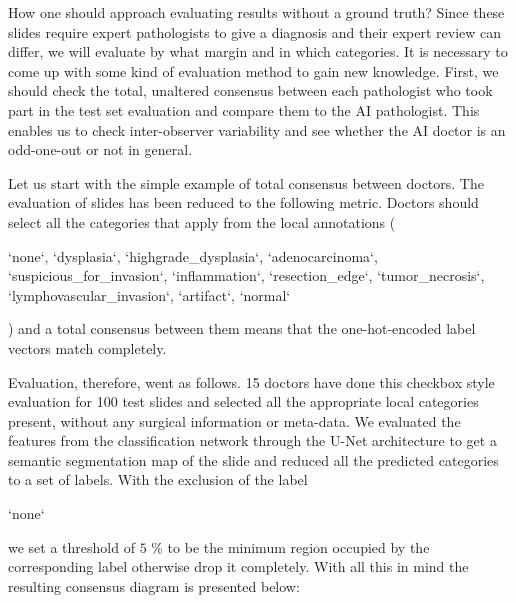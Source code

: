 \documentclass[a4paper,12pt]{article}
\begin{document}
\vspace{7mm}

\par How one should approach evaluating results without a ground truth? Since these slides require expert pathologists to give a diagnosis and their expert review can differ, we will evaluate by what margin and in which categories. It is necessary to come up with some kind of evaluation method to gain new knowledge. First, we should check the total, unaltered consensus between each pathologist who took part in the test set evaluation and compare them to the AI pathologist. This enables us to check inter-observer variability and see whether the AI doctor is an odd-one-out or not in general.

\vspace{4mm}

\par Let us start with the simple example of total consensus between doctors. The evaluation of slides has been reduced to the following metric. Doctors should select all the categories that apply from the local annotations ( \begin{markdown}
`none`, `dysplasia`, `highgrade_dysplasia`, `adenocarcinoma`, 
`suspicious_for_invasion`, `inflammation`, `resection_edge`,
`tumor_necrosis`, `lymphovascular_invasion`, `artifact`, `normal`
\end{markdown} 
) and a total consensus between them means that the one-hot-encoded label vectors match completely.

\vspace{4mm}

\par Evaluation, therefore, went as follows. 15 doctors have done this checkbox style evaluation for 100 test slides and selected all the appropriate local categories present, without any surgical information or meta-data. We evaluated the features from the classification network through the U-Net architecture to get a semantic segmentation map of the slide and reduced all the predicted categories to a set of labels. With the exclusion of the label \begin{markdown} `none` 
\end{markdown}
we set a threshold of $5$ \% to be the minimum region occupied by the corresponding label otherwise drop it completely. With all this in mind the resulting consensus diagram is presented below:
\end{document}
